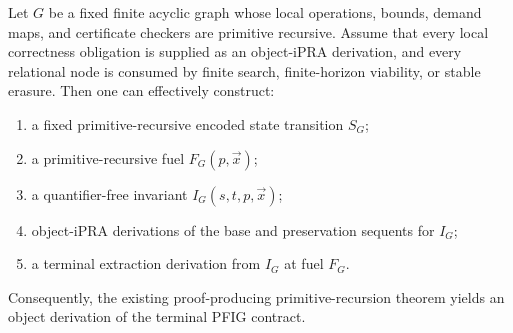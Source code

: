 \begin{theorem}
\label{thm:pfig-normal-form}
Let \(G\) be a fixed finite acyclic graph whose local operations, bounds, demand maps, and certificate checkers are primitive recursive.  Assume that every local correctness obligation is supplied as an object-iPRA derivation, and every relational node is consumed by finite search, finite-horizon viability, or stable erasure.  Then one can effectively construct:

\begin{enumerate}
\item a fixed primitive-recursive encoded state transition \(S_G\);
\item a primitive-recursive fuel \(F_G(p,\vec{x})\);
\item a quantifier-free invariant \(I_G(s,t,p,\vec{x})\);
\item object-iPRA derivations of the base and preservation sequents for \(I_G\);
\item a terminal extraction derivation from \(I_G\) at fuel \(F_G\).
\end{enumerate}

Consequently, the existing proof-producing primitive-recursion theorem yields an object derivation of the terminal PFIG contract.
\end{theorem}

